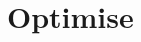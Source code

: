 \chapter{Optimise}
\hypertarget{md__r_e_a_d_m_e}{}\label{md__r_e_a_d_m_e}
\label{md__r_e_a_d_m_e_autotoc_md0}%
%
